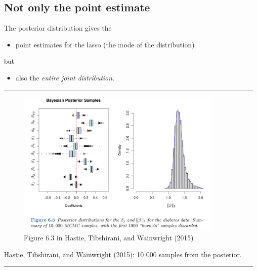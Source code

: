 \documentclass[
  letterpaper,
  DIV=11,
  numbers=noendperiod]{scrartcl}
\providecommand{\tightlist}{%
  \setlength{\itemsep}{0pt}\setlength{\parskip}{0pt}}\usepackage{longtable,booktabs,array}
\begin{document}
\hypertarget{not-only-the-point-estimate}{%
\subsection{Not only the point
estimate}\label{not-only-the-point-estimate}}

The posterior distribution gives the

\begin{itemize}
\tightlist
\item
  point estimates for the lasso (the mode of the distribution)
\end{itemize}

but

\begin{itemize}
\tightlist
\item
  also the \emph{entire joint distribution}.
\end{itemize}

\begin{center}\rule{0.5\linewidth}{0.5pt}\end{center}

\begin{figure}

{\centering \includegraphics[width=0.9\textwidth,height=\textheight]{./HTWFig63.jpg}

}

\caption{Figure 6.3 in Hastie, Tibshirani, and Wainwright (2015)}

\end{figure}

Hastie, Tibshirani, and Wainwright (2015): 10 000 samples from the
posterior.

\begin{center}\rule{0.5\linewidth}{0.5pt}\end{center}
\end{document}
